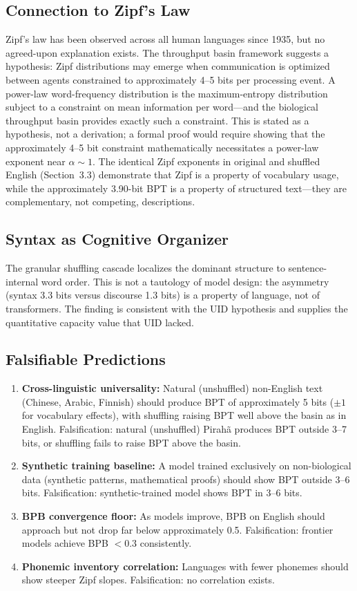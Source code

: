 \documentclass[11pt]{article}
\begin{document}
\subsection{Connection to Zipf's Law}

Zipf's law has been observed across all human languages since 1935, but no agreed-upon explanation exists. The throughput basin framework suggests a hypothesis: Zipf distributions may emerge when communication is optimized between agents constrained to approximately 4--5 bits per processing event. A power-law word-frequency distribution is the maximum-entropy distribution subject to a constraint on mean information per word---and the biological throughput basin provides exactly such a constraint. This is stated as a hypothesis, not a derivation; a formal proof would require showing that the approximately 4--5 bit constraint mathematically necessitates a power-law exponent near $\alpha \sim 1$. The identical Zipf exponents in original and shuffled English (Section~3.3) demonstrate that Zipf is a property of vocabulary usage, while the approximately 3.90-bit BPT is a property of structured text---they are complementary, not competing, descriptions.

\subsection{Syntax as Cognitive Organizer}

The granular shuffling cascade localizes the dominant structure to sentence-internal word order. This is not a tautology of model design: the asymmetry (syntax 3.3 bits versus discourse 1.3 bits) is a property of language, not of transformers. The finding is consistent with the UID hypothesis and supplies the quantitative capacity value that UID lacked.

\subsection{Falsifiable Predictions}

\begin{enumerate}
\item \textbf{Cross-linguistic universality:} Natural (unshuffled) non-English text (Chinese, Arabic, Finnish) should produce BPT of approximately 5 bits ($\pm 1$ for vocabulary effects), with shuffling raising BPT well above the basin as in English. Falsification: natural (unshuffled) Pirah\~a produces BPT outside 3--7 bits, or shuffling fails to raise BPT above the basin.
\item \textbf{Synthetic training baseline:} A model trained exclusively on non-biological data (synthetic patterns, mathematical proofs) should show BPT outside 3--6 bits. Falsification: synthetic-trained model shows BPT in 3--6 bits.
\item \textbf{BPB convergence floor:} As models improve, BPB on English should approach but not drop far below approximately 0.5. Falsification: frontier models achieve BPB $< 0.3$ consistently.
\item \textbf{Phonemic inventory correlation:} Languages with fewer phonemes should show steeper Zipf slopes. Falsification: no correlation exists.
\end{enumerate}
\end{document}
